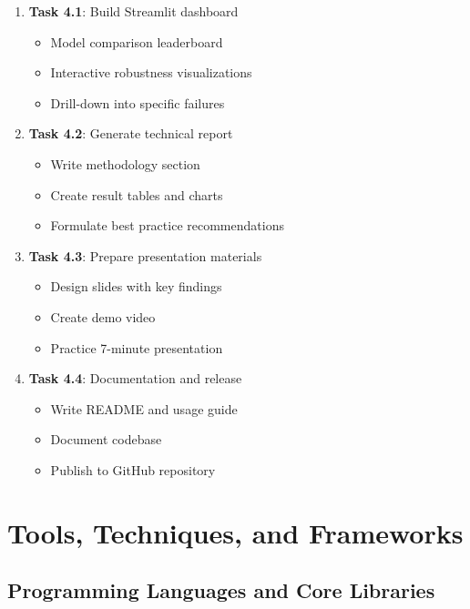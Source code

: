 \documentclass[11pt,a4paper]{article}
\begin{document}
\begin{enumerate}[leftmargin=*]
    \item \textbf{Task 4.1}: Build Streamlit dashboard
    \begin{itemize}
        \item Model comparison leaderboard
        \item Interactive robustness visualizations
        \item Drill-down into specific failures
    \end{itemize}
    
    \item \textbf{Task 4.2}: Generate technical report
    \begin{itemize}
        \item Write methodology section
        \item Create result tables and charts
        \item Formulate best practice recommendations
    \end{itemize}
    
    \item \textbf{Task 4.3}: Prepare presentation materials
    \begin{itemize}
        \item Design slides with key findings
        \item Create demo video
        \item Practice 7-minute presentation
    \end{itemize}
    
    \item \textbf{Task 4.4}: Documentation and release
    \begin{itemize}
        \item Write README and usage guide
        \item Document codebase
        \item Publish to GitHub repository
    \end{itemize}
\end{enumerate}

\section{Tools, Techniques, and Frameworks}

\subsection{Programming Languages and Core Libraries}
\end{document}
